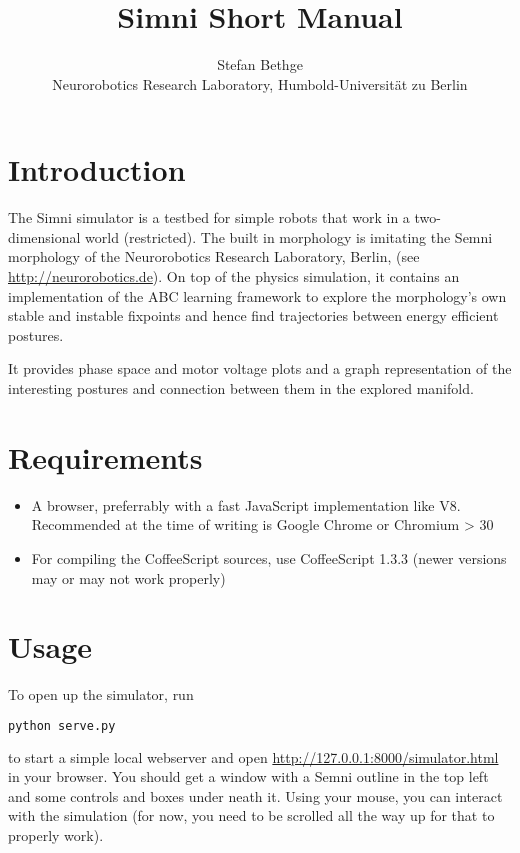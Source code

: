 \documentclass[10pt,a4paper]{article}
\begin{document}
\title{Simni Short Manual}
\author{Stefan Bethge\\
Neurorobotics Research Laboratory, Humbold-Universität zu Berlin}

\maketitle
\tableofcontents
\newpage
{}

\section{Introduction}

The Simni simulator is a testbed for simple robots that work in a two-dimensional world (restricted). The built in morphology is imitating the Semni morphology of the Neurorobotics Research Laboratory, Berlin, (see \url{http://neurorobotics.de}).
On top of the physics simulation, it contains an implementation of the ABC learning framework to explore the morphology's own stable and instable fixpoints and hence find trajectories between energy efficient postures. 

It provides phase space and motor voltage plots and a graph representation of the interesting postures and connection between them in the explored manifold.

\section{Requirements}

\begin{itemize}
\item A browser, preferrably with a fast JavaScript implementation like V8. Recommended at the time of writing is Google Chrome or Chromium > 30
\item For compiling the CoffeeScript sources, use CoffeeScript 1.3.3 (newer versions may or may not work properly)

\end{itemize}

\section{Usage}

To open up the simulator, run
\begin{lstlisting}[language=bash]
python serve.py
\end{lstlisting}
to start a simple local webserver and open \url{http://127.0.0.1:8000/simulator.html} in your
browser.
You should get a window with a Semni outline in the top left and some controls and boxes under
neath it. Using your mouse, you can interact with the simulation (for now, you need to be scrolled
all the way up for that to properly work).
\end{document}

